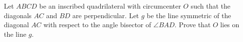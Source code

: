 Let $ABCD$ be an inscribed quadrilateral with circumcenter $O$ such that
the diagonals $AC$ and $BD$ are perpendicular.
Let $g$ be the line symmetric of the diagonal $AC$ with respect to the angle bisector of $\angle BAD$.
Prove that $O$ lies on the line $g$.
